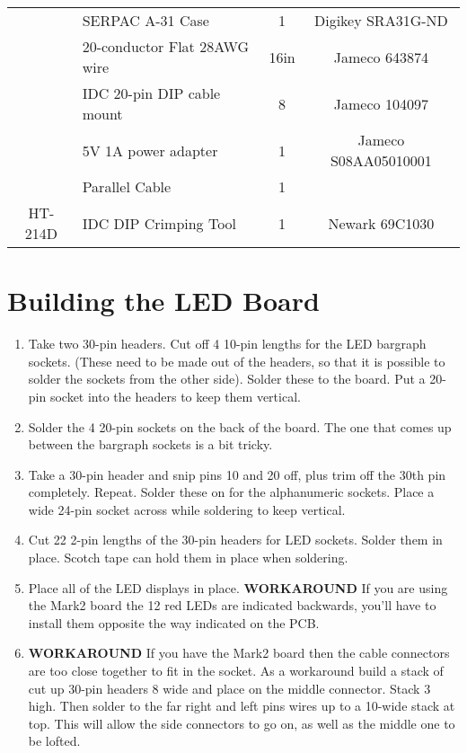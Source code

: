 \documentclass[11pt]{article}
\begin{document}
\begin{tabular}{|c|l|c|c|}
\hline
\hline
          & SERPAC A-31 Case           & 1   & Digikey SRA31G-ND \\ %
	  & 20-conductor Flat 28AWG wire & 16in & Jameco 643874 \\ %
          & IDC 20-pin DIP cable mount & 8   & Jameco 104097 \\ %
	  & 5V 1A power adapter        & 1   & Jameco S08AA05010001 \\ %
	  & Parallel Cable             & 1   & \\
HT-214D   & IDC DIP Crimping Tool      & 1   & Newark 69C1030 \\ %
\hline

\end{tabular}


\section{Building the LED Board}

\begin{enumerate}
\item Take two 30-pin headers.  Cut off 4 10-pin lengths for
      the LED bargraph sockets.  (These need to be made out
      of the headers, so that it is possible to solder the
      sockets from the other side).  Solder these to the board.
      Put a 20-pin socket into the headers to keep them vertical.
\item Solder the 4 20-pin sockets on the back of the board.
      The one that comes up between the bargraph sockets is a bit tricky.
\item Take a 30-pin header and snip pins 10 and 20 off, plus trim off
      the 30th pin completely.  Repeat.  Solder these on for the
      alphanumeric sockets.  Place a wide 24-pin socket across while
      soldering to keep vertical.
\item Cut 22 2-pin lengths of the 30-pin headers for LED sockets.
      Solder them in place.  Scotch tape can hold them in place when
      soldering.
\item Place all of the LED displays in place.  
      {\bf WORKAROUND} If you are using the
      Mark2 board the 12 red LEDs are indicated backwards, you'll
      have to install them opposite the way indicated on the PCB.
\item {\bf WORKAROUND} If you have the Mark2 board then the
      cable connectors are too close together to fit in the socket.
      As a workaround build a stack of cut up 30-pin headers 8 wide
      and place on the middle connector.
      Stack 3 high.  Then solder to the far right and left pins wires
      up to a 10-wide stack at top. This will allow the side connectors
      to go on, as well as the middle one to be lofted.
\end{enumerate}
\end{document}
